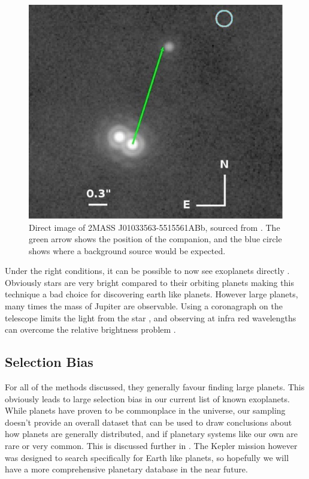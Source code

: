 \begin{figure}[ht]
    \centering
    \includegraphics[width=\figwidth]{images/direct_image.png}
    \caption{Direct image of 2MASS J01033563-5515561ABb, sourced from \cite{delorme2013direct}. The green arrow shows the position of the companion, and the blue circle shows where a background source would be expected.}
    \label{fig:direct}
\end{figure}

Under the right conditions, it can be possible to now see exoplanets directly \citep{lafreniere2010directly,kuzuhara2013direct,delorme2013direct}. Obviously stars are very bright compared to their orbiting planets making this technique a bad choice for discovering earth like planets. However large planets, many times the mass of Jupiter are observable. Using a coronagraph on the telescope limits the light from the star \citep{kuchner2002coronagraph}, and observing at infra red wavelengths can overcome the relative brightness problem \citep{delorme2013direct}.

\subsection{Selection Bias}

For all of the methods discussed, they generally favour finding large planets. This obviously leads to large selection bias in our current list of known exoplanets. While planets have proven to be commonplace in the universe, our sampling doesn't provide an overall dataset that can be used to draw conclusions about how planets are generally distributed, and if planetary systems like our own are rare or very common. This is discussed further in \citep{wright2011exoplanet}. The Kepler mission however was designed to search specifically for Earth like planets, so hopefully we will have a more comprehensive planetary database in the near future.

